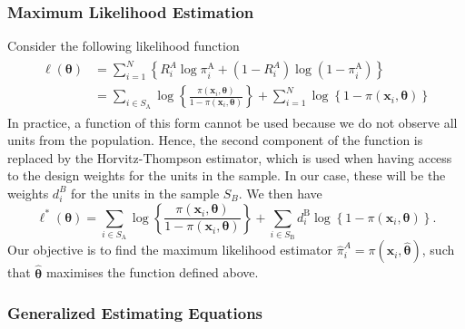 \documentclass[
]{jss}
\begin{document}
\subsubsection{Maximum Likelihood
Estimation}\label{maximum-likelihood-estimation}

Consider the following likelihood function \begin{align}
    \begin{split}
 \ell(\boldsymbol{\theta}) & =\sum_{i=1}^N\left\{R_i^A \log \pi_i^{\mathrm{A}}+\left(1-R_i^A\right) \log \left(1-\pi_i^{\mathrm{A}}\right)\right\} \\ & =\sum_{i \in S_{\mathrm{A}}} \log \left\{\frac{\pi\left(\boldsymbol{x}_i, \boldsymbol{\theta}\right)}{1-\pi\left(\boldsymbol{x}_i, \boldsymbol{\theta}\right)}\right\}+\sum_{i=1}^N \log \left\{1-\pi\left(\boldsymbol{x}_i, \boldsymbol{\theta}\right)\right\}
    \end{split}
\end{align} In practice, a function of this form cannot be used because
we do not observe all units from the population. Hence, the second
component of the function is replaced by the Horvitz-Thompson estimator,
which is used when having access to the design weights for the units in
the sample. In our case, these will be the weights \(d_i^B\) for the
units in the sample \(S_B\). We then have \begin{equation}
\ell^*(\boldsymbol{\theta})=\sum_{i \in S_{\mathrm{A}}} \log \left\{\frac{\pi\left(\boldsymbol{x}_i, \boldsymbol{\theta}\right)}{1-\pi\left(\boldsymbol{x}_i, \boldsymbol{\theta}\right)}\right\}+\sum_{i \in S_{\mathrm{B}}} d_i^{\mathrm{B}} \log \left\{1-\pi\left(\boldsymbol{x}_i, \boldsymbol{\theta}\right)\right\}.
\end{equation} Our objective is to find the maximum likelihood estimator
\(\hat{\pi}_{i}^{A} = \pi(\boldsymbol{x}_{i}, \hat{\boldsymbol{\theta}})\),
such that \(\hat{\boldsymbol{\theta}}\) maximises the function defined
above.

\subsubsection{Generalized Estimating
Equations}\label{generalized-estimating-equations}
\end{document}
